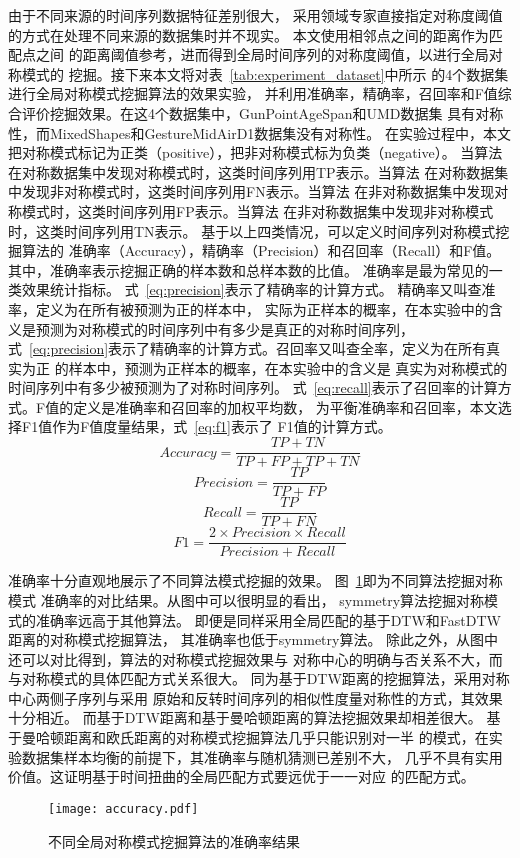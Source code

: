由于不同来源的时间序列数据特征差别很大，
采用领域专家直接指定对称度阈值的方式在处理不同来源的数据集时并不现实。
本文使用相邻点之间的距离作为匹配点之间
的距离阈值参考，进而得到全局时间序列的对称度阈值，以进行全局对称模式的
挖掘。接下来本文将对表~\ref{tab:experiment_dataset}中所示
的4个数据集进行全局对称模式挖掘算法的效果实验，
并利用准确率，精确率，召回率和F值综合评价挖掘效果。在这4个数据集中，GunPointAgeSpan和UMD数据集
具有对称性，而MixedShapes和GestureMidAirD1数据集没有对称性。
在实验过程中，本文把对称模式标记为正类（positive），把非对称模式标为负类（negative）。
当算法在对称数据集中发现对称模式时，这类时间序列用TP表示。当算法
在对称数据集中发现非对称模式时，这类时间序列用FN表示。当算法
在非对称数据集中发现对称模式时，这类时间序列用FP表示。当算法
在非对称数据集中发现非对称模式时，这类时间序列用TN表示。
基于以上四类情况，可以定义时间序列对称模式挖掘算法的
准确率（Accuracy），精确率（Precision）和召回率（Recall）和F值。
其中，准确率表示挖掘正确的样本数和总样本数的比值。
准确率是最为常见的一类效果统计指标。
式~\ref{eq:precision}表示了精确率的计算方式。
精确率又叫查准率，定义为在所有被预测为正的样本中，
实际为正样本的概率，在本实验中的含义是预测为对称模式的时间序列中有多少是真正的对称时间序列，
式~\ref{eq:precision}表示了精确率的计算方式。召回率又叫查全率，定义为在所有真实为正
的样本中，预测为正样本的概率，在本实验中的含义是
真实为对称模式的时间序列中有多少被预测为了对称时间序列。
式~\ref{eq:recall}表示了召回率的计算方式。F值的定义是准确率和召回率的加权平均数，
为平衡准确率和召回率，本文选择F1值作为F值度量结果，式~\ref{eq:f1}表示了
F1值的计算方式。
\begin{equation}
  Accuracy=\frac{TP+TN}{TP+FP+TP+TN}
  \label{eq:Accuracy}
\end{equation}
\begin{equation}
  Precision=\frac{TP}{TP+FP}
  \label{eq:precision}
\end{equation}
\begin{equation}
  Recall=\frac{TP}{TP+FN}
  \label{eq:recall}
\end{equation}
\begin{equation}
  F1=\frac{2 \times Precision \times Recall}{Precision+Recall}
  \label{eq:f1}
\end{equation}

准确率十分直观地展示了不同算法模式挖掘的效果。
图~\ref{fig:accuracy_compare}即为不同算法挖掘对称模式
准确率的对比结果。从图中可以很明显的看出，
symmetry算法挖掘对称模式的准确率远高于其他算法。
即便是同样采用全局匹配的基于DTW和FastDTW距离的对称模式挖掘算法，
其准确率也低于symmetry算法。
除此之外，从图中还可以对比得到，算法的对称模式挖掘效果与
对称中心的明确与否关系不大，而与对称模式的具体匹配方式关系很大。
同为基于DTW距离的挖掘算法，采用对称中心两侧子序列与采用
原始和反转时间序列的相似性度量对称性的方式，其效果十分相近。
而基于DTW距离和基于曼哈顿距离的算法挖掘效果却相差很大。
基于曼哈顿距离和欧氏距离的对称模式挖掘算法几乎只能识别对一半
的模式，在实验数据集样本均衡的前提下，其准确率与随机猜测已差别不大，
几乎不具有实用价值。这证明基于时间扭曲的全局匹配方式要远优于一一对应
的匹配方式。
\begin{figure}
  \centering
  \texttt{[image: accuracy.pdf]}
  \caption{不同全局对称模式挖掘算法的准确率结果}
  \label{fig:accuracy_compare}
\end{figure}

